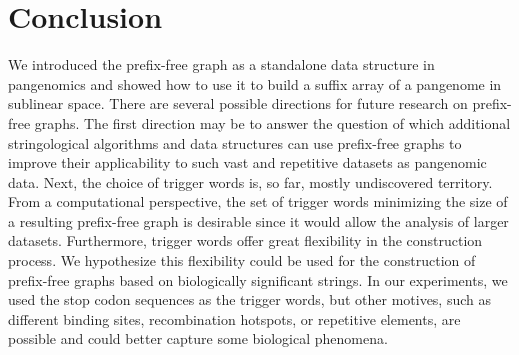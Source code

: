 \section{Conclusion}
We introduced the prefix-free graph as a standalone data structure in pangenomics and showed how to use it to build a suffix array of a pangenome in sublinear space.
There are several possible directions for future research on prefix-free graphs.
The first direction may be to answer the question of which additional stringological algorithms and data structures can use prefix-free graphs to improve their applicability to such vast and repetitive datasets as pangenomic data.
Next, the choice of trigger words is, so far, mostly undiscovered territory.
From a computational perspective, the set of trigger words minimizing the size of a resulting prefix-free graph is desirable since it would allow the analysis of larger datasets.
Furthermore, trigger words offer great flexibility in the construction process.
We hypothesize this flexibility could be used for the construction of prefix-free graphs based on biologically significant strings.
In our experiments, we used the stop codon sequences as the trigger words, but other motives, such as different binding sites, recombination hotspots, or repetitive elements, are possible and could better capture some biological phenomena.

